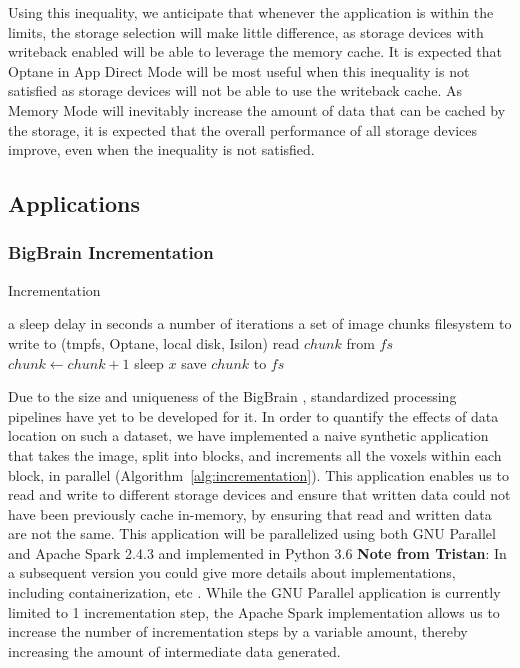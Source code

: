 \documentclass[conference]{IEEEtran}
\newcommand{\Desc}[2]{\State \makebox[2em][l]{#1}#2}
\newcommand{\bigbrain}{BigBrain }
\newcommand{\tristan}[1]{\color{orange}\textbf{Note from Tristan}:
      #1 \color{black}}
\begin{document}
Using this inequality, we anticipate that whenever the application is within the limits,
the storage selection will make little difference, as storage devices with writeback enabled 
will be able to leverage the memory cache. It is expected that Optane in App Direct Mode
will be most useful when this inequality is not satisfied as storage devices will
not be able to use the writeback cache. As Memory Mode will inevitably
increase the amount of data that can be cached by the storage, it is expected that the overall
performance of all storage devices improve, even when the inequality is not satisfied.

\subsection{Applications}
\subsubsection{ \bigbrain Incrementation}

\begin{algorithm}\caption{Incrementation}\label{alg:incrementation}
    \begin{algorithmic}[1]
    \Input
        \Desc{$x$}{a sleep delay in seconds}
        \Desc{$n$}{a number of iterations}
        \Desc{$C$}{a set of image chunks}
        \Desc{$fs$}{filesystem to write to (tmpfs, Optane, local disk, Isilon)}
    \EndInput
        \State read $chunk$ from $fs$
            \State $chunk\gets chunk+1$
            \State sleep $x$
        \EndFor
        \State save $chunk$ to $fs$
    \EndFor
    \end{algorithmic}
\end{algorithm}  

Due to the size and uniqueness of the \bigbrain, standardized processing pipelines
have yet to be developed for it. In order to quantify the effects of data location
on such a dataset, we have implemented a naive synthetic application that takes 
the image, split into blocks, and increments all the voxels within each block, in parallel (Algorithm~\ref{alg:incrementation}).
This application
enables us to read and write to different storage devices and ensure that written
data could not have been previously cache
in-memory, by ensuring that read and written data are not the same. This application
will be parallelized using both GNU Parallel and Apache Spark 2.4.3 and implemented in Python 3.6 \tristan{In a subsequent 
version you could give more details about implementations, including containerization, etc}. While the GNU Parallel application
is currently limited to 1 incrementation step, the Apache Spark implementation allows us to increase
the number of incrementation steps by a variable amount, thereby increasing the amount of intermediate
data generated.
\end{document}

